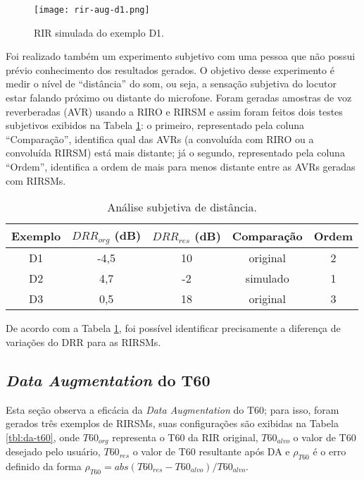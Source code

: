 \begin{figure} [H]
    \centering
    \texttt{[image: rir-aug-d1.png]}
    \caption{RIR simulada do exemplo D1.}
    \label{fig:rir-aug-d1}
\end{figure} 

Foi realizado também um experimento subjetivo com uma pessoa que não possui prévio conhecimento dos resultados gerados.
O objetivo desse experimento é medir o nível de “distância” do som, ou seja, a sensação subjetiva do locutor estar falando próximo ou distante
do microfone.
Foram geradas amostras de voz reverberadas (AVR) usando a RIRO e RIRSM e assim foram feitos dois testes subjetivos exibidos na Tabela \ref{tbl:drr-exp}:
o primeiro, representado pela coluna “Comparação”, identifica qual das AVRs (a convoluída com RIRO ou a convoluída RIRSM) está mais distante;
já o segundo, representado pela coluna “Ordem”, identifica a ordem de mais para menos distante entre as AVRs geradas com RIRSMs.

\begin{table} [H]
    \centering
    \caption{Análise subjetiva de distância.}
    \label{tbl:drr-exp}
    \begin{tabular}{c|c|c|c|c}

        \textbf{Exemplo} & 
        \textbf{$DRR_{org}$ (dB)} & 
        \textbf{$DRR_{res}$ (dB)} & 
        \textbf{Comparação} &
        \textbf{Ordem} \\
        \hline 

        D1 & -4,5 & 10 & original & 2 \\
        D2 & 4,7 & -2 & simulado & 1 \\
        D3 & 0,5 & 18 & original & 3 \\

    \end{tabular}
\end{table}

De acordo com a Tabela \ref{tbl:drr-exp}, foi possível identificar precisamente a diferença de variações do DRR para as RIRSMs.


\subsection{\textit{Data Augmentation} do T60}

Esta seção observa a eficácia da \textit{Data Augmentation} do T60; para isso, foram gerados três exemplos de RIRSMs, suas configurações
são exibidas na Tabela \ref{tbl:da-t60}, onde $T60_{org}$ representa o T60 da RIR original, $T60_{alvo}$ o valor de T60 desejado pelo usuário,
$T60_{res}$ o valor de T60 resultante após DA e $\rho_{T60}$ é o erro definido da forma $\rho_{T60} = abs(T60_{res} - T60_{alvo})/T60_{alvo}$.

